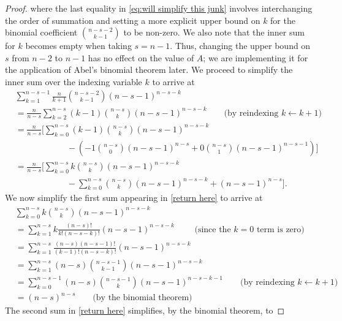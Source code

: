 \documentclass[12pt,reqno]{amsart}
\theoremstyle{definition}
\theoremstyle{remark}
\begin{document}
\begin{proof}
where the last equality in \eqref{eq:will simplify this junk} involves interchanging the order of summation and setting a more explicit upper bound on $k$ for the binomial coefficient $\binom{n-s-2}{k-1}$ to be non-zero. We also note that the inner sum for $k$ becomes empty when taking $s=n-1$. Thus, changing the upper bound on $s$ from $n-2$ to $n-1$ has no effect on the value of $A$; we are implementing it for the application of Abel's binomial theorem later. We proceed to simplify the inner sum over the indexing variable $k$ to arrive at
\begin{align}
    &\sum_{k=1}^{n-s-1}\frac{n}{k+1}\binom{n-s-2}{k-1}(n-s-1)^{n-s-k}\nonumber\\
   &=\frac{n}{n-s}\sum_{k=2}^{n-s}(k-1)\binom{n-s}{k}(n-s-1)^{n-s-k}\qquad\mbox{(by reindexing $k \leftarrow k+1$)}\nonumber\\
    &=\frac{n}{n-s}\Bigg[\sum_{k=0}^{n-s}(k-1)\binom{n-s}{k}(n-s-1)^{n-s-k}\nonumber\\
    &\hspace{1in}-\left(-1\binom{n-s}{0}(n-s-1)^{n-s}+0\binom{n-s}{1}(n-s-1)^{n-s-1}\right)\Bigg]\nonumber\\
    &=\frac{n}{n-s}\Bigg[\sum_{k=0}^{n-s}k\binom{n-s}{k}(n-s-1)^{n-s-k}\nonumber\\
    &\hspace{1in}-\sum_{k=0}^{n-s}\binom{n-s}{k}(n-s-1)^{n-s-k}+(n-s-1)^{n-s}\Bigg].\label{return here}
\end{align}
We now simplify the first sum appearing in \eqref{return here} to arrive at
\begin{align}
    &\sum_{k=0}^{n-s}k\binom{n-s}{k}(n-s-1)^{n-s-k}\nonumber\\
    &=\sum_{k=1}^{n-s}k\frac{(n-s)!}{k!(n-s-k)!}(n-s-1)^{n-s-k}\qquad\mbox{ (since the $k=0$ term is zero)}\nonumber\\
    &=\sum_{k=1}^{n-s}\frac{(n-s)(n-s-1)!}{(k-1)!(n-s-k)!}(n-s-1)^{n-s-k}\nonumber\\
    &=\sum_{k=1}^{n-s}(n-s)\binom{n-s-1}{k-1}(n-s-1)^{n-s-k}\nonumber\\
    &=\sum_{k=0}^{n-s-1}(n-s)\binom{n-s-1}{k}(n-s-1)^{n-s-k-1}\qquad\mbox{(by reindexing $k\leftarrow k+1$)}\nonumber\\
    &=(n-s)^{n-s}\qquad\mbox{(by the binomial theorem)}\label{messy}\nonumber
\end{align}
The second sum in \eqref{return here} simplifies, by the binomial theorem, to 

\end{proof}
\end{document}
